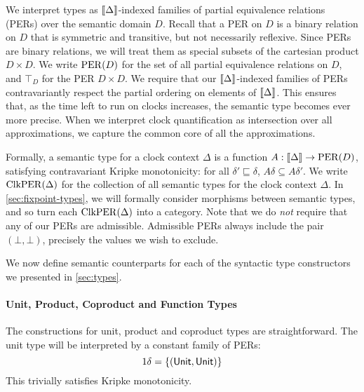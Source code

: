 We interpret types as $\llbracket \Delta \rrbracket$-indexed families of partial
equivalence relations (PERs) over the semantic domain $D$. Recall that
a PER on $D$ is a binary relation on $D$ that is symmetric and
transitive, but not necessarily reflexive. Since PERs are binary
relations, we will treat them as special subsets of the cartesian
product $D \times D$. We write $\mathrm{PER}(D)$ for the set of all partial
equivalence relations on $D$, and $\top_D$ for the PER $D \times D$.
We require that our $\llbracket \Delta \rrbracket$-indexed families of PERs
contravariantly respect the partial ordering on elements of
$\llbracket \Delta \rrbracket$. This ensures that, as the time left to run on clocks
increases, the semantic type becomes ever more precise. When we
interpret clock quantification as intersection over all
approximations, we capture the common core of all the approximations.

Formally, a semantic type for a clock context $\Delta$ is a function
$A : \llbracket \Delta \rrbracket \to \mathrm{PER}(D)$, satisfying contravariant Kripke
monotonicity: for all $\delta' \sqsubseteq \delta$, $A\delta \subseteq
A\delta'$. We write $\mathrm{ClkPER}(\Delta)$ for the collection of all
semantic types for the clock context $\Delta$. In
\autoref{sec:fixpoint-types}, we will formally consider morphisms
between semantic types, and so turn each $\mathrm{ClkPER}(\Delta)$ into a
category. Note that we do \emph{not} require that any of our PERs are
admissible. Admissible PERs always include the pair $(\bot,\bot)$,
precisely the values we wish to exclude.

We now define semantic counterparts for each of the syntactic type
constructors we presented in \autoref{sec:types}.

\paragraph{Unit, Product, Coproduct and Function Types}

The constructions for unit, product and coproduct types are
straightforward. The unit type will be interpreted by a constant
family of PERs:
\begin{displaymath}
  1\delta = \{(\mathsf{Unit}, \mathsf{Unit})\}
\end{displaymath}
This trivially satisfies Kripke monotonicity.

